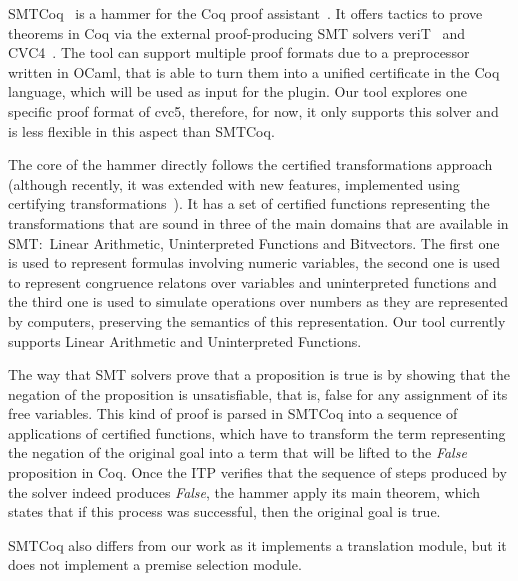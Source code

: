 SMTCoq~\cite{smtcoq} is a hammer for the Coq proof assistant~\cite{Bertot2004}.
It offers tactics to prove theorems in Coq via the external proof-producing SMT
solvers veriT~\cite{Bouton2009} and CVC4~\cite{Barrett2011}. The tool can support multiple proof formats
due to a preprocessor written in OCaml, that is able to turn them
into a unified certificate in the Coq language,
which will be used as input for the plugin. Our tool explores one specific
proof format of cvc5, therefore, for now, it only supports this solver and is
less flexible in this aspect than SMTCoq.

The core of the hammer directly follows the certified transformations approach
(although recently, it was extended with new features, implemented using
certifying transformations~\cite{snipe}).
%
It has a set of certified functions representing the transformations
that are sound in three of the main domains that are available in SMT:\
Linear Arithmetic, Uninterpreted Functions and Bitvectors. The first one is used to
represent formulas involving numeric variables, the second one is
used to represent congruence relatons over variables and uninterpreted functions and
the third one is used to simulate operations over numbers as they are represented
by computers, preserving the semantics of this representation.
%
Our tool currently supports Linear Arithmetic and Uninterpreted Functions.

The way that SMT solvers prove
that a proposition is true is by showing that the negation of the proposition is unsatisfiable,
that is, false for any assignment of its free variables. This kind of proof
is parsed in SMTCoq into a sequence of applications of certified functions, which have
to transform the term representing the negation of the original goal into a
term that will be lifted to the \textit{False} proposition in Coq. Once the
ITP verifies that the sequence of steps produced by the solver indeed
produces \textit{False}, the hammer apply its main theorem, which states that if
this process was successful, then the original goal is true.

SMTCoq also differs from our work as it implements a translation module, but
it does not implement a premise selection module.
